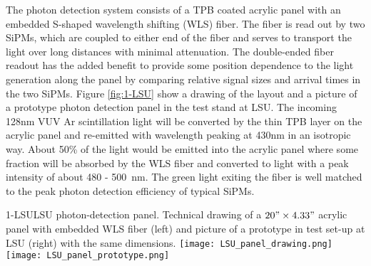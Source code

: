 The photon detection system consists of a TPB coated acrylic panel
with an embedded S-shaped wavelength shifting (WLS) fiber. The fiber
is read out by two SiPMs, which are coupled to either end of the fiber
and serves to transport the light over long distances with minimal
attenuation. The double-ended fiber readout has the added benefit to
provide some position dependence to the light generation along the
panel by comparing relative signal sizes and arrival times in the two
SiPMs. Figure \ref{fig:1-LSU} show a drawing of the layout and a
picture of a prototype photon detection panel in the test stand at
LSU.  The incoming 128nm VUV Ar scintillation light will be converted
by the thin TPB layer on the acrylic panel and re-emitted with
wavelength peaking at 430nm in an isotropic way. About 50\% of the
light would be emitted into the acrylic panel where some fraction will
be absorbed by the WLS fiber and converted to light with a peak
intensity of about 480 - 500~nm. The green light exiting the fiber is
well matched to the peak photon detection efficiency of typical SiPMs.

\begin{cdrfigure}{1-LSU}{LSU photon-detection panel. Technical drawing of a $20"\times4.33"$ acrylic panel with embedded WLS fiber (left) and picture of a prototype in test set-up at LSU (right) with the same dimensions.}
\texttt{[image: LSU\_panel\_drawing.png]}
\texttt{[image: LSU\_panel\_prototype.png]}
\end{cdrfigure}




